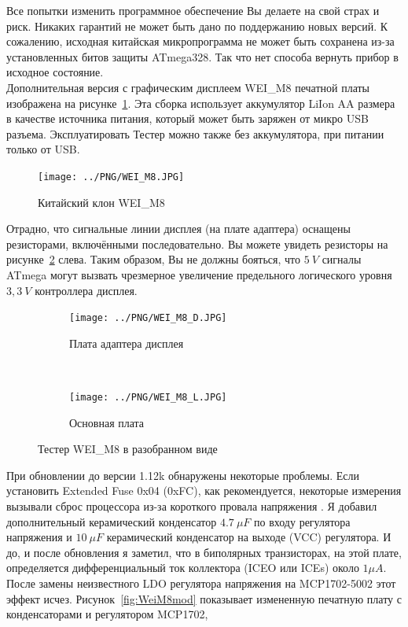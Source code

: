 Все попытки изменить программное обеспечение Вы делаете на свой страх и риск.
Никаких гарантий не может быть дано по поддержанию новых версий.
К сожалению, исходная китайская микропрограмма не может быть сохранена 
из-за установленных битов защиты ATmega328. Так что нет способа вернуть прибор в исходное состояние.\\

Дополнительная версия с графическим дисплеем WEI\_M8 печатной платы изображена на рисунке~\ref{fig:WeiM8}. 
Эта сборка использует аккумулятор LiIon AA размера в качестве источника питания, который может быть 
заряжен от микро USB разъема. 
Эксплуатировать Тестер можно также без аккумулятора, при питании только от USB.
\begin{figure}[H]
\centering
\texttt{[image: ../PNG/WEI\_M8.JPG]}
\caption{Китайский клон WEI\_M8}
\label{fig:WeiM8}
\end{figure}
Отрадно, что сигнальные линии дисплея (на плате адаптера) оснащены резисторами, включёнными 
последовательно. Вы можете увидеть резисторы на рисунке~\ref{fig:WeiM8int} слева.
Таким образом, Вы не должны бояться, что \(5~V\) сигналы ATmega могут вызвать чрезмерное 
увеличение предельного логического уровня \(3,3~V\) контроллера дисплея.
\begin{figure}[H]
  \begin{subfigure}[b]{.5\textwidth}
    \centering
    \texttt{[image: ../PNG/WEI\_M8\_D.JPG]}
    \caption{Плата адаптера дисплея}
  \end{subfigure}
  ~
  \begin{subfigure}[b]{.5\textwidth}
    \centering
    \texttt{[image: ../PNG/WEI\_M8\_L.JPG]}
    \caption{Основная плата}
  \end{subfigure}
  \caption{Тестер WEI\_M8 в разобранном виде}
  \label{fig:WeiM8int}
\end{figure}
При обновлении до версии 1.12k обнаружены некоторые проблемы.
Если установить Extended Fuse 0x04 (0xFC), как рекомендуется, некоторые измерения вызывали сброс
процессора из-за короткого провала напряжения .
Я добавил дополнительный керамический конденсатор \(4.7~\mu F\) по входу 
регулятора напряжения и \(10~\mu F\) керамический конденсатор на выходе (VCC) регулятора.
И до, и после обновления я заметил, что в биполярных транзисторах, на этой плате, определяется 
дифференциальный ток коллектора (ICEO или ICEs) около \(1\mu A\).
После замены неизвестного LDO регулятора напряжения на MCP1702-5002 этот эффект исчез. 
Рисунок~\ref{fig:WeiM8mod} показывает измененную печатную плату с конденсаторами и регулятором MCP1702, 
